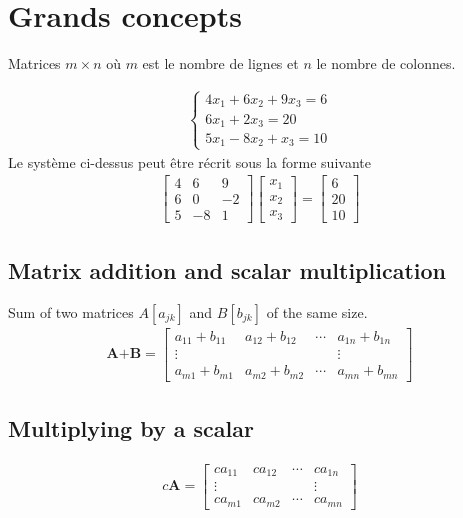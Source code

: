 \chapter{Grands concepts}
\begin{myDefinition}
	Matrices $m\times n$ où $m$ est le nombre de lignes et $n$ le nombre de colonnes.
\end{myDefinition}
\begin{eqnarray*}
	\begin{cases}
		4x_1+6x_2+9x_3=6\\
		6x_1+2x_3=20\\
		5x_1-8x_2+x_3=10
	\end{cases}
\end{eqnarray*}
Le système ci-dessus peut être récrit sous la forme suivante
\begin{eqnarray*}
	\begin{bmatrix}
		4 &6& 9\\
		6  &0 &-2\\
		5 & -8 & 1
	\end{bmatrix}
	\begin{bmatrix}
		x_1\\x_2\\x_3
	\end{bmatrix}
	=\begin{bmatrix}
		6\\20\\10
	\end{bmatrix}
\end{eqnarray*}


\section{Matrix addition and scalar multiplication}
\begin{myDefinition}
	Sum of two matrices $A[a_{jk}]$ and $B[b_{jk}]$ of the same size.
	\begin{eqnarray}
		\textbf{A+B}=
		\begin{bmatrix}
			a_{11}+b_{11} & a_{12}+b_{12} & \cdots & a_{1n}+b_{1n}
			\\
			\vdots & & & \vdots
			\\
			a_{m1}+b_{m1} & a_{m2}+b_{m2} & \cdots & a_{mn}+b_{mn}
		\end{bmatrix}
	\end{eqnarray}
\end{myDefinition}
\section{Multiplying by a scalar}
\begin{myDefinition}
	\begin{eqnarray}
		c\textbf{A}=
		\begin{bmatrix}
			ca_{11}&ca_{12}&\cdots&ca_{1n}
			\\
			\vdots&&&\vdots
			\\
			ca_{m1}&ca_{m2}&\cdots&ca_{mn}
		\end{bmatrix}	
	\end{eqnarray}
	
\end{myDefinition}
